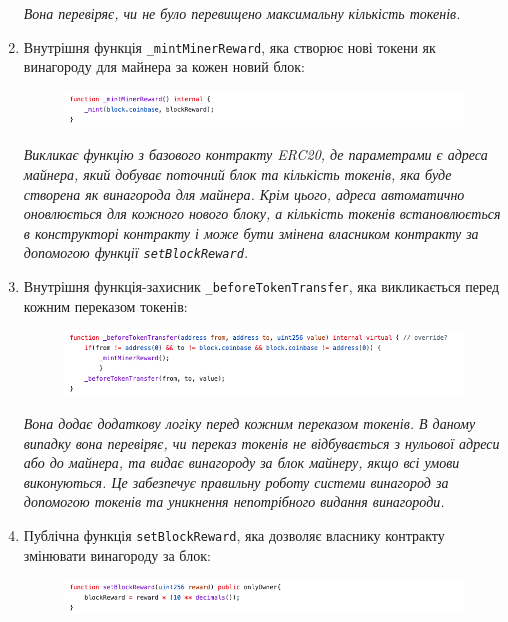 \begin{enumerate}
    \textit{Вона перевіряє, чи не було перевищено максимальну кількість токенів.}

    \item Внутрішня функція \texttt{\_mintMinerReward}, яка створює нові токени як винагороду для майнера за кожен новий блок:

    \begin{figure}[ht]
        \centering
        \includegraphics[scale=0.6]{IMAGES/code3.png}
        \label{fig_vsc}
    \end{figure}

    \textit{Викликає функцію з базового контракту ERC20, де параметрами є адреса майнера, який добуває поточний блок та кількість токенів, яка буде створена як винагорода для майнера. Крім цього, адреса автоматично оновлюється для кожного нового блоку, а кількість токенів встановлюється в конструкторі контракту і може бути змінена власником контракту за допомогою функції \texttt{setBlockReward}.}

    \item Внутрішня функція-захисник \texttt{\_beforeTokenTransfer}, яка викликається перед кожним переказом токенів:

    \begin{figure}[ht]
        \centering
        \includegraphics[scale=0.6]{IMAGES/code4.png}
        \label{fig_vsc}
    \end{figure}

    \textit{Вона додає додаткову логіку перед кожним переказом токенів. В даному випадку вона перевіряє, чи переказ токенів не відбувається з нульової адреси або до майнера, та видає винагороду за блок майнеру, якщо всі умови виконуються. Це забезпечує правильну роботу системи винагород за допомогою токенів та уникнення непотрібного видання винагороди.}
    
    \item Публічна функція \texttt{setBlockReward}, яка дозволяє власнику контракту змінювати винагороду за блок:

    \begin{figure}[ht]
        \centering
        \includegraphics[scale=0.6]{IMAGES/code5.png}
        \label{fig_vsc}
    \end{figure}


\end{enumerate}

